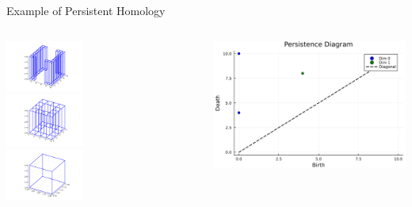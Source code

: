 \documentclass[aspectratio=169,xcolor=dvipsnames]{beamer}
\begin{document}
\begin{frame}{Example of Persistent Homology}
    \begin{columns}
        \centering
        \includegraphics[width=0.4\textwidth]{step1.png}\\
        \vspace{0.5cm}
        \includegraphics[width=0.4\textwidth]{step2.png}\\
        \vspace{0.5cm}
        \includegraphics[width=0.4\textwidth]{step3.png}
        
        \centering
        \includegraphics[width=\textwidth]{persistance.png}
    \end{columns}
\end{frame}
\end{document}
